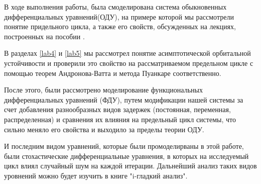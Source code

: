 \Conclusion %
В ходе выполнения работы, была смоделирована система
обыкновенных дифференциальных уравнений(ОДУ), на примере которой
мы рассмотрели понятие придельного цикла, а
также его свойств, обсужденных на лекциях, построенных
на пособии \cite{bookdiff}.

В разделах \ref{lab4} и \ref{lab5} мы рассмотрел понятие асимптотической
орбитальной устойчивости и проверили это свойство на рассматриваемом
предельном цикле с помощью теорем Андронова-Ватта и метода
Пуанкаре соответственно.

После этого, были рассмотрено моделирование функциональных
дифференциальных уравнений (ФДУ), путем модификации
нашей системы за счет добавления разнообразных видов задержек
(постоянная, переменная, распределенная) и сравнения их влияния
на предельный цикл системы, что сильно меняло его свойства
и выходило за пределы теории ОДУ.

И последним видом уравнений, которые были промоделирваны в
этой работе, были стохастические дифференциальные уравнения,
в которых на исследуемый цикл влиял случайный шум на каждой
итерации. Дальнейший анализ таких видов уровнений можно будет
изучить в книге "i-гладкий анализ"\cite{bookananlyz}.

